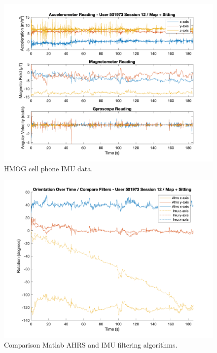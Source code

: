 \documentclass{article}
\begin{document}
\begin{figure}[ht]
  \includegraphics[width=1\linewidth]{images/501973_12_acc_mag_gyr_data.png}
  \caption[]{HMOG cell phone IMU data.}
  \label{fig:501973_12_imu}
\end{figure}

\begin{figure}[ht]
  \includegraphics[width=1\linewidth]{images/501973_12_orientation_compare_filters.png}
  \caption[]{Comparison Matlab AHRS and IMU filtering algorithms.}
  \label{fig:501973_12_compare_filter}
\end{figure}
\end{document}
